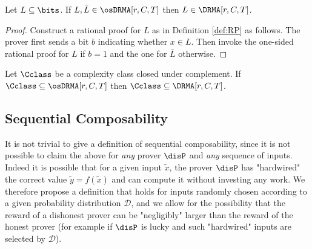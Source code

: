 \begin{lemma}
	Let $L \subseteq \bits$. If $L, \bar{L} \in \osDRMA[r, C, T]$ then $L  \in \DRMA[r, C, T]$.
\end{lemma}
\begin{proof}
	Construct a rational proof for $L$ as in Definition \ref{def:RP} as follows. The prover first sends a bit $b$ indicating whether $x \in L$. Then invoke the one-sided rational proof for $L$ if $b = 1$ and the one for $\bar{L}$ otherwise. 
\end{proof}

\begin{corollary}
	Let $\Cclass$ be a complexity class closed under complement. If $\Cclass \subseteq \osDRMA[r, C, T]$ then $\Cclass \subseteq \DRMA[r, C, T]$.
\end{corollary}

\begin{comment}
A composition theorem (in its weak version: for yes/no Rational Proofs):
\begin{theorem}
Let $\protOne = (P_1, V_1^{L_2})$ be a (yes/no) rational proof for language $L_1$ with noticeable reward gap and let $V^{L_2}$ have oracle access to language $L_2$ with at most $O(1)$ queries.
Let $\protTwo (P_2, V_2)$ be a (yes/no) rational proof for $L_2$ with noticeable reward gap.
Then there exists a (yes/no) rational proof $\pi$ for $L_1$ with noticeable reward gap.
Moreover if $\protOne$ and $\protTwo$ have round, communication and verification complexity respectively $r_1(n), cc_1(n), T_1(n)$  and $r_2(n), cc_2(n), T_2(n)$ then language $L_1 \in DRMA[r_1(n) + O(r_2(n)), cc_1(n) + O(cc_2(n)), T_1(n) + O(T_2(n))]$
\end{theorem}
\end{comment}




\subsection{Sequential Composability}
\label{sec:sq-def}





It is not trivial to give a definition of sequential composability, since it is not possible to claim the above for {\em any} prover $\disP$ and {\em any} sequence of inputs. Indeed it
is possible that for a given input $\tilde{x}$, the prover $\disP$ has "hardwired" the correct value $\tilde{y}=f(\tilde{x})$ and can compute it without investing 
any work. We therefore propose a definition that holds for inputs randomly chosen according to a given probability distribution $\mathcal D$, and we allow for
the possibility that the reward of a dishonest prover can be "negligibly" larger than the reward of the honest prover (for example if $\disP$ is lucky and such 
"hardwired" inputs are selected by $\mathcal D$).

